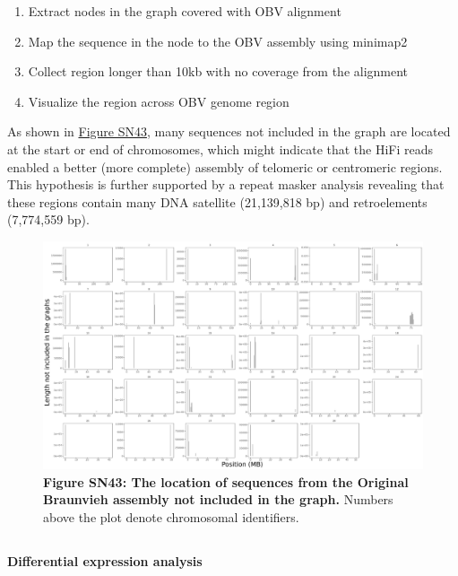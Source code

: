 \documentclass[../main.tex]{subfiles}
\begin{document}
\begin{flushleft}
\bigskip

\begin{enumerate}
    \item Extract nodes in the graph covered with OBV alignment
    \item Map the sequence in the node to the OBV assembly using minimap2
    \item Collect region longer than 10kb with no coverage from the alignment
    \item Visualize the region across OBV genome region
\end{enumerate}

\bigskip

As shown in \hyperlink{Figure SN43}{Figure SN43}, many sequences not included in the graph are located at the start or end of chromosomes, which might indicate that the HiFi reads enabled a better (more complete) assembly of telomeric or centromeric regions. This hypothesis is further supported by a repeat masker analysis revealing that these regions contain many DNA satellite (21,139,818 bp) and retroelements (7,774,559 bp).

\bigskip
\begin{figure}[!htb]
    \centering
    \includegraphics[width=\textwidth]{paper3/supplement/sp417.png}
    \caption*{\textbf{\hypertarget{Figure SN43}{Figure SN43}: The location of sequences from the Original Braunvieh assembly not included in the graph.} Numbers above the plot denote chromosomal identifiers.}
\end{figure}

\clearpage

\subsection{}
\label{sup_not:s44}
\textbf{Differential expression analysis}
\bigskip


\end{flushleft}
\end{document}
